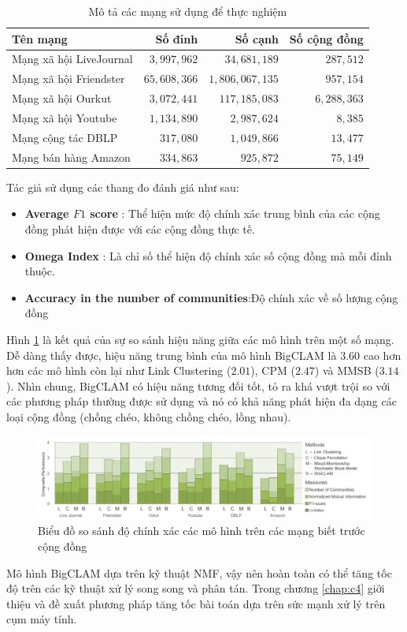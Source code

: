 \begin{table}[H]
	\centering
	\caption{Mô tả các mạng sử dụng để thực nghiệm}
	\label{comtruth}
	\begin{tabular}{@{}lrrr@{}}
		\toprule
		Tên mạng                & Số đỉnh      & Số cạnh         & Số cộng đồng \\ \midrule
		Mạng xã hội LiveJournal & $3,997,962$  & $34,681,189$    & $287,512$    \\
		Mạng xã hội Friendster  & $65,608,366$ & $1,806,067,135$ & $957,154$    \\
		Mạng xã hội Ourkut      & $3,072,441$  & $117,185,083$   & $6,288,363$  \\
		Mạng xã hội Youtube     & $1,134,890$  & $2,987,624$     & $8,385$      \\
		Mạng cộng tác DBLP      & $317,080$    & $1,049,866$     & $13,477$     \\
		Mạng bán hàng Amazon    & $334,863$    & $925,872$       & $75,149$     \\ \bottomrule
	\end{tabular}
\end{table}
Tác giả sử dụng các thang đo đánh giá như sau:
\begin{itemize}
	\item \textbf{Average $F1$ score} \citep{1742-5468-2011-02-P02017} : Thể hiện mức độ chính xác trung bình của các cộng đồng phát hiện được với các cộng đồng thực tế.
	\item \textbf{Omega Index} \cite{gregory2011fuzzy}: Là chỉ số thể hiện độ chính xác số cộng đồng mà mỗi đỉnh thuộc.
	\item \textbf{Accuracy in the number of communities}:Độ chính xác về số lượng cộng đồng
\end{itemize}
Hình \ref{fig:ground-truthcommunities} là kết quả của sự so sánh hiệu năng giữa các mô hình trên một số mạng. Dễ dàng thấy được, hiệu năng trung bình của mô hình BigCLAM là $3.60$ cao hơn hơn các mô hình còn lại như Link Clustering ($2.01$), CPM ($2.47$) và MMSB ($3.14$). Nhìn chung, BigCLAM có hiệu năng tương đối tốt, tỏ ra khá vượt trội so với các phương pháp thường được sử dụng và nó có khả năng phát hiện đa dạng các loại cộng đồng (chồng chéo, không chồng chéo, lồng nhau).
\begin{figure}[H]
	\centering
	\includegraphics[width=\linewidth]{Chapter3/Chapter3Figs/ground-truthcommunities.png}
	\caption{Biểu đồ so sánh độ chính xác các mô hình trên các mạng biết trước cộng đồng}
	\label{fig:ground-truthcommunities}
\end{figure}

Mô hình BigCLAM dựa trên kỹ thuật NMF, vậy nên hoàn toàn có thể tăng tốc độ trên các kỹ thuật xử lý song song và phân tán. Trong chương \ref{chap:c4} giới thiệu và đề xuất phương pháp tăng tốc bài toán dựa trên sức mạnh xử lý trên cụm máy tính.
